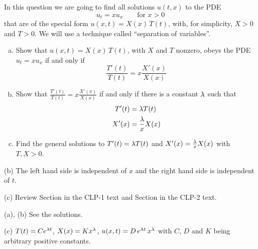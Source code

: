 \begin{question}
In this question we are going to find all solutions $u(t,x)$ to the PDE
\begin{equation*}
u_t=xu_x\qquad\text{for }x>0
\end{equation*}
that are of the special form $u(x,t)= X(x)\,T(t)$, with, for simplicity, $X>0$ and $T>0$. 
We will use a technique called ``separation of variables''.
\begin{enumerate}[(a)]
\item 
Show that $u(x,t)= X(x)\,T(t)$, with $X$ and $T$ nonzero, obeys the PDE
$u_t=xu_x$ if and only if
\begin{equation*}
\frac{T'(t)}{T(t)} = x\frac{X'(x)}{X(x)}
\end{equation*}
\item 
Show that $\frac{T'(t)}{T(t)} = x\frac{X'(x)}{X(x)}$ if and only if there is a constant $\lambda$ such that
\begin{align*}
T'(t)&=\lambda T(t) \\
X'(x)&=\frac{\lambda}{x} X(x) 
\end{align*}
\item 
Find the general solutions to  $T'(t)=\lambda T(t)$ and $X'(x)=\frac{\lambda}{x} X(x)$
with $T,X>0$.
\end{enumerate}
 
\end{question}

\begin{hint}
(b) The left hand side is independent of $x$ and the right hand side is 
independent of $t$.

(c) Review Section  in the CLP-1 text
and Section  in the CLP-2 text.
\end{hint}

\begin{answer}
(a), (b) See the solutions.

(c) $T(t) = Ce^{\lambda t}$, $X(x) = K x^\lambda$, $u(x,t)= D\,e^{\lambda t}\,x^\lambda$ with $C$, $D$ and $K$ being arbitrary positive constants.
\end{answer}

